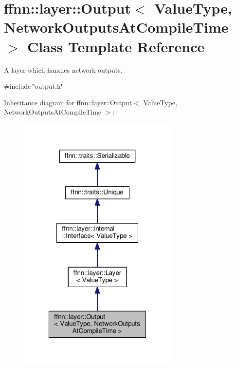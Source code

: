 \hypertarget{classffnn_1_1layer_1_1_output}{\section{ffnn\-:\-:layer\-:\-:Output$<$ Value\-Type, Network\-Outputs\-At\-Compile\-Time $>$ Class Template Reference}
\label{classffnn_1_1layer_1_1_output}
}


A layer which handles network outputs.  




{\ttfamily \#include \char`\"{}output.\-h\char`\"{}}



Inheritance diagram for ffnn\-:\-:layer\-:\-:Output$<$ Value\-Type, Network\-Outputs\-At\-Compile\-Time $>$\-:
\nopagebreak
\begin{figure}[H]
\begin{center}
\leavevmode
\includegraphics[width=228pt]{classffnn_1_1layer_1_1_output__inherit__graph}
\end{center}
\end{figure}


